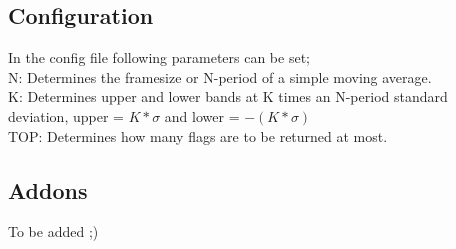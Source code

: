 \documentclass[11pt]{article}
\begin{document}
\subsection{Configuration}
In the config file following parameters can be set;\\
N: Determines the framesize or N-period of a simple moving average.\\
K: Determines upper and lower bands at K times an N-period standard deviation, upper = $ K*\sigma$ and lower = $-(K*\sigma)$\\
TOP: Determines how many flags are to be returned at most.

\subsection{Addons}

To be added ;)
\end{document}
